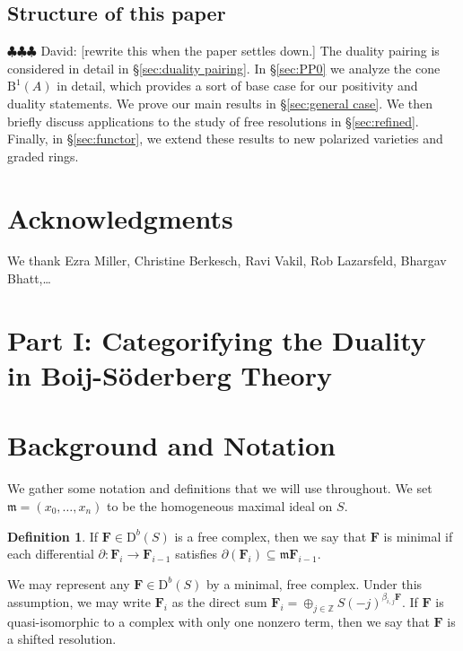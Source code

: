 \documentclass[12pt]{amsart}
\theoremstyle{definition}
\newtheorem{defn}[lemma]{Definition}
\theoremstyle{remark}
\newcommand{\ZZ}{\mathbb{Z}}
\newcommand{\FF}{\mathbf{F}}
\newcommand{\defi}[1]{\textsf{#1}} %
\newcommand{\DD}{\mathrm{D}}
\newcommand{\BBQ}{\mathrm{B}}
\newcommand{\david}[1]{{\color{red} \sf $\clubsuit\clubsuit\clubsuit$ David: [#1]}}
\begin{document}
\subsection*{Structure of this paper}
\david{rewrite this when the paper settles down.} 
 The duality pairing is considered in detail in \S\ref{sec:duality pairing}. In \S\ref{sec:PP0} we analyze the cone $\BBQ^1(A)$ in detail, which provides a sort of base case for our positivity and duality statements.  We prove our main results in \S\ref{sec:general case}.  We then briefly discuss applications to the study of free resolutions in \S\ref{sec:refined}.  Finally, in \S\ref{sec:functor}, we extend these results to new polarized varieties and graded rings.

\section*{Acknowledgments}
We thank Ezra Miller, Christine Berkesch, Ravi Vakil, Rob Lazarsfeld, Bhargav Bhatt,\dots



\section*{Part I: Categorifying the Duality in Boij-S\"oderberg Theory}
\section{Background and Notation}\label{sec:notation}
We gather some notation and definitions that we will use throughout.  We set $\mathfrak m=(x_0, \dots, x_n)$ to be the homogeneous maximal ideal on $S$.
\begin{defn}
If $\FF\in \DD^b(S)$ is a free complex, then we say that $\FF$ is \defi{minimal} if each differential $\partial: \FF_i\to \FF_{i-1}$ satisfies $\partial(\FF_i)\subseteq \mathfrak m\FF_{i-1}$.
\end{defn}
We may represent any $\FF\in \DD^b(S)$ by a minimal, free complex.  Under this assumption, we may write $\FF_i$ as the direct sum $\FF_i=\oplus_{j\in \ZZ} S(-j)^{\beta_{i,j}\FF}$.  If $\FF$ is quasi-isomorphic to a complex with only one nonzero term, then we say that $\FF$ is a \defi{shifted resolution}.
\end{document}
